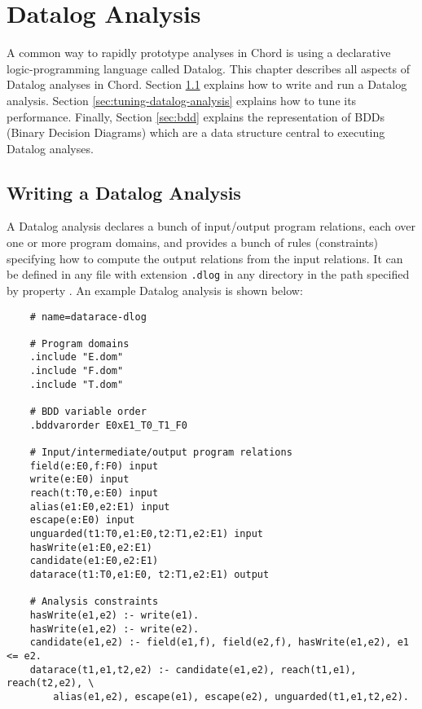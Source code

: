 \chapter{Datalog Analysis}
\label{chap:datalog-analysis}

A common way to rapidly prototype analyses in Chord is using a declarative
logic-programming language called Datalog.  This chapter describes all aspects of
Datalog analyses in Chord.
Section \ref{sec:writing-datalog-analysis} explains how to write and run a Datalog analysis.
Section \ref{sec:tuning-datalog-analysis} explains how to tune its performance.
Finally, Section \ref{sec:bdd} explains the representation of BDDs (Binary Decision Diagrams)
which are a data structure central to executing Datalog analyses.

\section{Writing a Datalog Analysis}
\label{sec:writing-datalog-analysis}

A Datalog analysis declares a bunch of input/output program relations,
each over one or more program domains, and provides a bunch of rules (constraints)
specifying how to compute the output relations from the input relations.
It can be defined in any file with extension {\tt .dlog}
in any directory in the path specified by property .
An example Datalog analysis is shown below:

\texonly{\newpage}

\begin{framed}
{\small
\begin{verbatim}
    # name=datarace-dlog

    # Program domains
    .include "E.dom"
    .include "F.dom"
    .include "T.dom"

    # BDD variable order
    .bddvarorder E0xE1_T0_T1_F0

    # Input/intermediate/output program relations
    field(e:E0,f:F0) input
    write(e:E0) input
    reach(t:T0,e:E0) input
    alias(e1:E0,e2:E1) input
    escape(e:E0) input
    unguarded(t1:T0,e1:E0,t2:T1,e2:E1) input
    hasWrite(e1:E0,e2:E1)
    candidate(e1:E0,e2:E1) 
    datarace(t1:T0,e1:E0, t2:T1,e2:E1) output

    # Analysis constraints
    hasWrite(e1,e2) :- write(e1).
    hasWrite(e1,e2) :- write(e2).
    candidate(e1,e2) :- field(e1,f), field(e2,f), hasWrite(e1,e2), e1 <= e2.
    datarace(t1,e1,t2,e2) :- candidate(e1,e2), reach(t1,e1), reach(t2,e2), \
        alias(e1,e2), escape(e1), escape(e2), unguarded(t1,e1,t2,e2).
\end{verbatim}
}
\end{framed}

